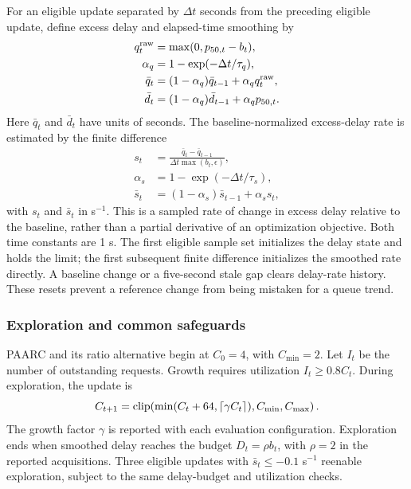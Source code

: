 For an eligible update separated by $\Delta t$ seconds from the preceding eligible update, define excess delay and elapsed-time smoothing by
\begin{align}
q_t^{\rm raw}&=\max(0,p_{50,t}-b_t),\\
\alpha_q&=1-\exp(-\Delta t/\tau_q),\\
\bar q_t&=(1-\alpha_q)\bar q_{t-1}+\alpha_q q_t^{\rm raw},\\
\bar d_t&=(1-\alpha_q)\bar d_{t-1}+\alpha_q p_{50,t}.
\label{eq:delay}
\end{align}
Here $\bar q_t$ and $\bar d_t$ have units of seconds. The baseline-normalized excess-delay rate is estimated by the finite difference
\begin{align}
s_t&=\frac{\bar q_t-\bar q_{t-1}}{\Delta t\max(b_t,\epsilon)},\\
\alpha_s&=1-\exp(-\Delta t/\tau_s),\\
\bar s_t&=(1-\alpha_s)\bar s_{t-1}+\alpha_s s_t,
\label{eq:delay-rate}
\end{align}
with $s_t$ and $\bar s_t$ in s$^{-1}$. This is a sampled rate of change in excess delay relative to the baseline, rather than a partial derivative of an optimization objective. Both time constants are 1 s. The first eligible sample set initializes the delay state and holds the limit; the first subsequent finite difference initializes the smoothed rate directly. A baseline change or a five-second stale gap clears delay-rate history. These resets prevent a reference change from being mistaken for a queue trend.

\subsubsection{Exploration and common safeguards}
PAARC and its ratio alternative begin at $C_0=4$, with $C_{\min}=2$. Let $I_t$ be the number of outstanding requests. Growth requires utilization $I_t\geq0.8C_t$. During exploration, the update is
\begin{equation}
C_{t+1}=\operatorname{clip}\!\left(\min(C_t+64,\left\lceil \gamma C_t\right\rceil),C_{\min},C_{\max}\right).
\label{eq:startup}
\end{equation}
The growth factor $\gamma$ is reported with each evaluation configuration. Exploration ends when smoothed delay reaches the budget $D_t=\rho b_t$, with $\rho=2$ in the reported acquisitions. Three eligible updates with $\bar s_t\leq-0.1$ s$^{-1}$ reenable exploration, subject to the same delay-budget and utilization checks.

